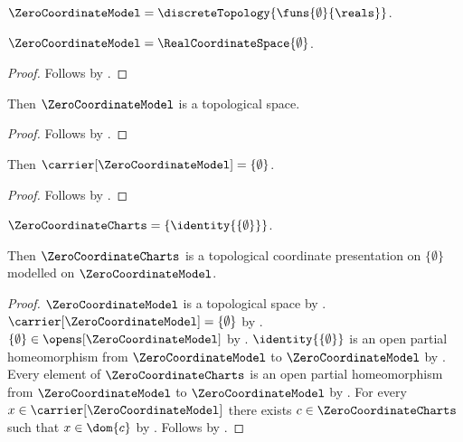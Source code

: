 \begin{definition}\label{zero_coordinate_model}
    $\ZeroCoordinateModel=\discreteTopology{\funs{\emptyset}{\reals}}$.
\end{definition}

\begin{theorem}\label{zero_coordinate_model_is_real_coordinate_space}
    $\ZeroCoordinateModel=\RealCoordinateSpace{\emptyset}$.
\end{theorem}
\begin{proof}
    Follows by .
\end{proof}

\begin{classification}\label{zero_coordinate_model_is_topological_space}
    Then $\ZeroCoordinateModel$ is a topological space.
\end{classification}
\begin{proof}
    Follows by .
\end{proof}

\begin{theorem}\label{zero_coordinate_model_carrier}
    Then $\carrier[\ZeroCoordinateModel]=\{\emptyset\}$.
\end{theorem}
\begin{proof}
    Follows by .
\end{proof}

\begin{definition}\label{zero_coordinate_charts}
    $\ZeroCoordinateCharts=\{\identity{\{\emptyset\}}\}$.
\end{definition}

\begin{classification}\label{zero_coordinate_charts_presentation}
    Then $\ZeroCoordinateCharts$ is a topological coordinate presentation on
        $\{\emptyset\}$ modelled on $\ZeroCoordinateModel$.
\end{classification}
\begin{proof}
    $\ZeroCoordinateModel$ is a topological space by
        .
    $\carrier[\ZeroCoordinateModel]=\{\emptyset\}$ by
        .
    $\{\emptyset\}\in\opens[\ZeroCoordinateModel]$ by .
    $\identity{\{\emptyset\}}$ is an open partial homeomorphism from
        $\ZeroCoordinateModel$ to $\ZeroCoordinateModel$ by
        .
    Every element of $\ZeroCoordinateCharts$ is an open partial homeomorphism
        from $\ZeroCoordinateModel$ to $\ZeroCoordinateModel$ by
        .
    For every $x\in\carrier[\ZeroCoordinateModel]$ there exists
        $c\in\ZeroCoordinateCharts$ such that $x\in\dom{c}$ by
        .
    Follows by .
\end{proof}

